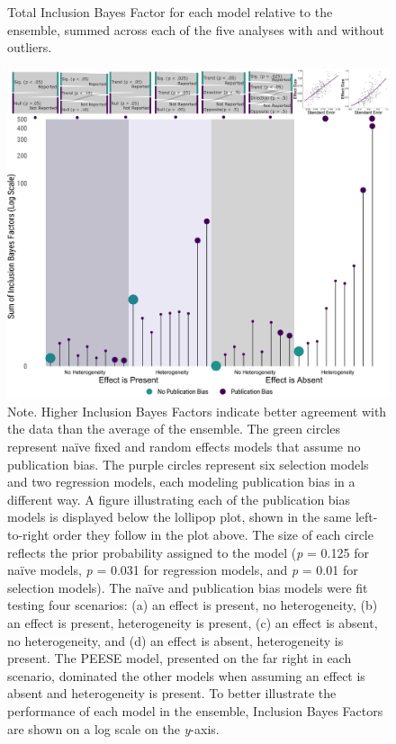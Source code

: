 \documentclass[man,floatsintext,letterpaper,12pt]{apa7}
\begin{document}
\begin{figure}[htbp]
    \caption{Total Inclusion Bayes Factor for each model relative to the ensemble, summed across each of the five analyses with and without outliers.}
    \centering
    \includegraphics[scale=0.28]{../../figs/fig3.pdf}
    \setlength{\belowcaptionskip}{-2em}
    \caption*{\singlespacing \small Note. \normalfont Higher Inclusion Bayes Factors indicate better agreement with the data than the average of the ensemble. The green circles represent naïve fixed and random effects models that assume no publication bias. The purple circles represent six selection models and two regression models, each modeling publication bias in a different way. A figure illustrating each of the publication bias models is displayed below the lollipop plot, shown in the same left-to-right order they follow in the plot above. The size of each circle reflects the prior probability assigned to the model (\emph{p} = 0.125 for naïve models, \emph{p} = 0.031 for regression models, and \emph{p} = 0.01 for selection models). The naïve and publication bias models were fit testing four scenarios: (a) an effect is present, no heterogeneity, (b) an effect is present, heterogeneity is present, (c) an effect is absent, no heterogeneity, and (d) an effect is absent, heterogeneity is present. The PEESE model, presented on the far right in each scenario, dominated the other models when assuming an effect is absent and heterogeneity is present. To better illustrate the performance of each model in the ensemble, Inclusion Bayes Factors are shown on a log scale on the \emph{y}-axis.}
    \label{fig:fig3}
\end{figure}
\end{document}
